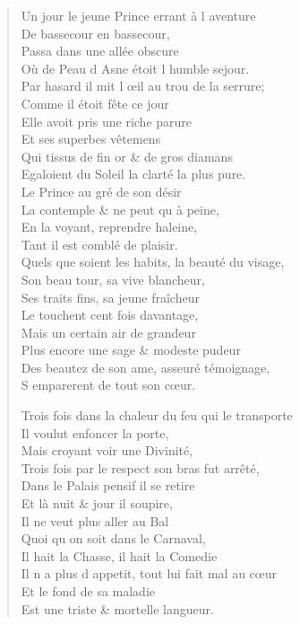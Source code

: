 \documentclass[14pt,a4paper]{memoir}
\begin{document}
{{\begin{otherlanguage}{french}
\begin{verse}
Un jour le jeune Prince errant à l\textquotesingle{} aventure \\
\vin De bassecour en bassecour, \\
\vin Passa dans une allée obscure \\
\vin Où de Peau d\textquotesingle{} Asne étoit l\textquotesingle{} humble sejour. \\
Par hasard il mit l\textquotesingle{} œil au trou de la serrure; \\
\vin Comme il étoit fête ce jour \\
\vin Elle avoit pris une riche parure \\
\vin Et ses superbes vêtemens \\
Qui tissus de fin or \& de gros diamans \\
Egaloient du Soleil la clarté la plus pure. \\
\vin Le Prince au gré de son désir \\
\vin La contemple \& ne peut qu\textquotesingle{} à peine, \\
\vin En la voyant, reprendre haleine, \\
\vin Tant il est comblé de plaisir. \\
Quels que soient les habits, la beauté du visage, \\
\vin Son beau tour, sa vive blancheur, \\
\vin Ses traits fins, sa jeune fraîcheur \\
\vin Le touchent cent fois davantage, \\
\vin Mais un certain air de grandeur \\
Plus encore une sage \& modeste pudeur \\
Des beautez de son ame, asseuré témoignage, \\
\vin S\textquotesingle{} emparerent de tout son cœur.

Trois fois dans la chaleur du feu qui le transporte \\
\vin Il voulut enfoncer la porte, \\
\vin Mais croyant voir une Divinité, \\
Trois fois par le respect son bras fut arrêté, \\
Dans le Palais pensif il se retire \\
\vin Et là nuit \& jour il soupire, \\
\vin Il ne veut plus aller au Bal \\
\vin Quoi qu\textquotesingle{} on soit dans le Carnaval, \\
\vin Il hait la Chasse, il hait la Comedie \\
Il n\textquotesingle{} a plus d\textquotesingle{} appetit, tout lui fait mal au cœur \\
\vin Et le fond de sa maladie \\
\vin Est une triste \& mortelle langueur.


\end{verse}
\end{otherlanguage}}}
\end{document}
